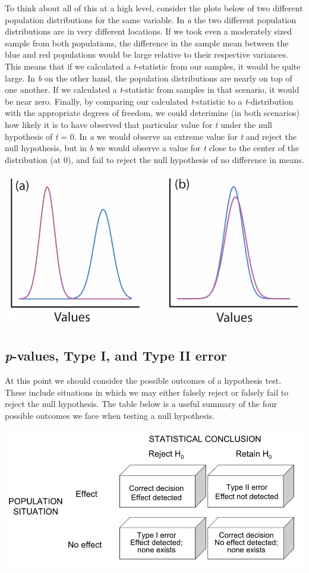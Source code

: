 \documentclass[]{book}
\begin{document}
To think about all of this at a high level, consider the plots below of two different population distributions for the same variable. In \emph{a} the two different population distributions are in very different locations. If we took even a moderately sized sample from both populations, the difference in the sample mean between the blue and red populations would be large relative to their respective variances. This means that if we calculated a \emph{t}-statistic from our samples, it would be quite large. In \emph{b} on the other hand, the population distributions are nearly on top of one another. If we calculated a \emph{t}-statistic from samples in that scenario, it would be near zero. Finally, by comparing our calculated \emph{t}-statistic to a \emph{t}-distribution with the appropriate degrees of freedom, we could deterimine (in both scenarios) how likely it is to have observed that particular value for \emph{t} under the null hypothesis of \emph{t} = 0. In \emph{a} we would observe an extreme value for \emph{t} and reject the null hypothesis, but in \emph{b} we would observe a value for \emph{t} close to the center of the distribution (at 0), and fail to reject the null hypothesis of no difference in means.

\begin{center}\includegraphics[width=0.5\linewidth]{images/week_3.001} \end{center}

\hypertarget{p-values-type-i-and-type-ii-error}{%
\subsection{\texorpdfstring{\emph{p}-values, Type I, and Type II error}{p-values, Type I, and Type II error}}\label{p-values-type-i-and-type-ii-error}}

At this point we should consider the possible outcomes of a hypothesis test. These include situations in which we may either falsely reject or falsely fail to reject the null hypothesis. The table below is a useful summary of the four possible outcomes we face when testing a null hypothesis.

\begin{center}\includegraphics[width=0.5\linewidth]{images/week_3.007} \end{center}
\end{document}
